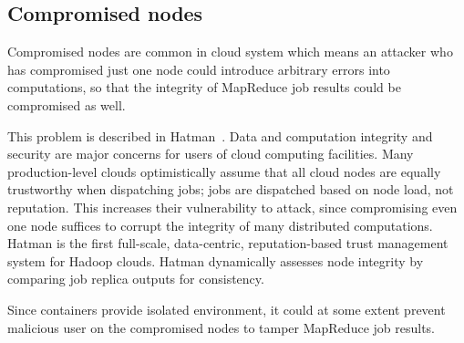 \subsection{Compromised nodes}
Compromised nodes are common in cloud system which means an attacker who has compromised just one node could introduce arbitrary errors into computations, so that the integrity of MapReduce job results could be compromised as well.

This problem is described in Hatman~\cite{khan2012hatman}. Data and computation integrity and security are major concerns for users of cloud computing facilities. Many production-level clouds optimistically assume that all cloud nodes are equally trustworthy when dispatching jobs; jobs are dispatched based on node load, not reputation. This increases their vulnerability to attack, since compromising even one node suffices to corrupt the integrity of many distributed computations. Hatman is the first full-scale, data-centric, reputation-based trust management system for Hadoop clouds. Hatman dynamically assesses node integrity by comparing job replica outputs for consistency.

Since containers provide isolated environment, it could at some extent prevent malicious user on the compromised nodes to tamper MapReduce job results. 
